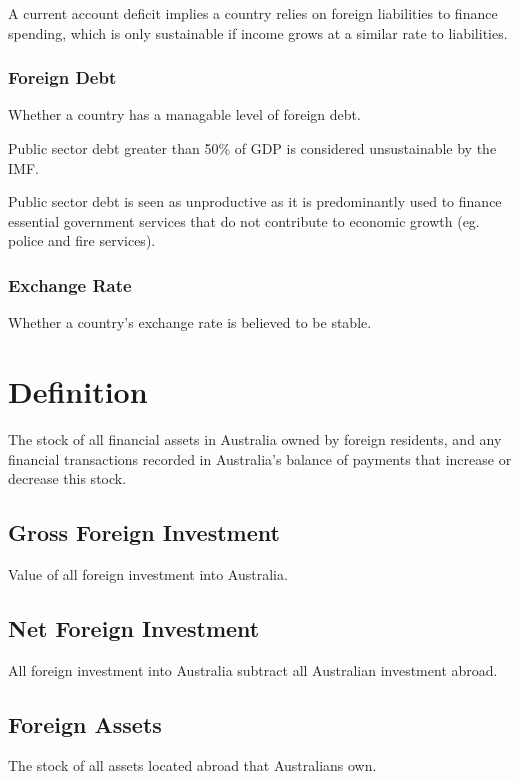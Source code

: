 \documentclass[a4paper,11pt]{report}
\begin{document}
A current account deficit implies a country relies on foreign liabilities to
finance spending, which is only sustainable if income grows at a similar rate
to liabilities.

\subsubsection{Foreign Debt}

Whether a country has a managable level of foreign debt.

Public sector debt greater than 50\% of GDP is considered unsustainable by the
IMF.

Public sector debt is seen as unproductive as it is predominantly used to
finance essential government services that do not contribute to economic
growth (eg. police and fire services).

\subsubsection{Exchange Rate}

Whether a country's exchange rate is believed to be stable.


\section{Definition}

The stock of all financial assets in Australia owned by foreign residents, and
any financial transactions recorded in Australia's balance of payments that
increase or decrease this stock.

\subsection{Gross Foreign Investment}

Value of all foreign investment into Australia.

\subsection{Net Foreign Investment}

All foreign investment into Australia subtract all Australian investment
abroad.

\subsection{Foreign Assets}

The stock of all assets located abroad that Australians own.
\end{document}
